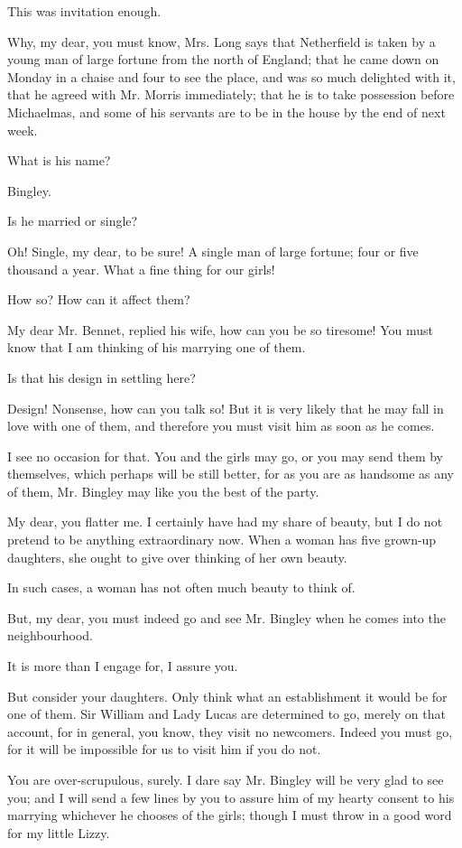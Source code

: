 \documentclass{article}
\begin{document}
This was invitation enough.

Why, my dear, you must know, Mrs. Long says that Netherfield is taken
by a young man of large fortune from the north of England; that he came
down on Monday in a chaise and four to see the place, and was so much
delighted with it, that he agreed with Mr. Morris immediately; that he
is to take possession before Michaelmas, and some of his servants are to
be in the house by the end of next week.

What is his name?

Bingley.

Is he married or single?

Oh! Single, my dear, to be sure! A single man of large fortune; four or
five thousand a year. What a fine thing for our girls!

How so? How can it affect them?

My dear Mr. Bennet, replied his wife, how can you be so tiresome! You
must know that I am thinking of his marrying one of them.

Is that his design in settling here?

Design! Nonsense, how can you talk so! But it is very likely that he
may fall in love with one of them, and therefore you must visit him as
soon as he comes.

I see no occasion for that. You and the girls may go, or you may send
them by themselves, which perhaps will be still better, for as you are
as handsome as any of them, Mr. Bingley may like you the best of the
party.

My dear, you flatter me. I certainly have had my share of beauty, but
I do not pretend to be anything extraordinary now. When a woman has five
grown-up daughters, she ought to give over thinking of her own beauty.

In such cases, a woman has not often much beauty to think of.

But, my dear, you must indeed go and see Mr. Bingley when he comes into
the neighbourhood.

It is more than I engage for, I assure you.

But consider your daughters. Only think what an establishment it would
be for one of them. Sir William and Lady Lucas are determined to
go, merely on that account, for in general, you know, they visit no
newcomers. Indeed you must go, for it will be impossible for us to
visit him if you do not.

You are over-scrupulous, surely. I dare say Mr. Bingley will be very
glad to see you; and I will send a few lines by you to assure him of my
hearty consent to his marrying whichever he chooses of the girls; though
I must throw in a good word for my little Lizzy.
\end{document}
